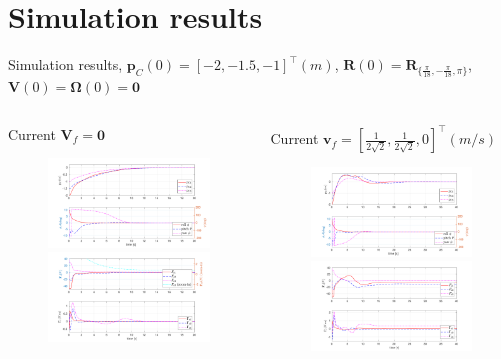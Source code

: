 \documentclass{beamer}
\begin{document}
\section{Simulation results}
\begin{frame}{Simulation results, \tiny$\mathbf{p}_C(0) = [-2, -1.5, -1 ]^{\top} (m)$, $\mathbf{R}(0) = \mathbf{R}_{\{\frac{\pi}{18},-\frac{\pi}{18},\pi\}}$, $\mathbf{V}(0) = \mathbf{\Omega}(0) = \mathbf{0}$}
	\begin{columns}
		\begin{block}{Current $\mathbf{V}_f = \mathbf{0}$}
			\begin{figure}
				\includegraphics[width = 58mm]{Images/Data_sansCurrent_pos_RollPitch_Yaw2.pdf}\\
				\includegraphics[width = 58mm]{Images/Data_sansCurrent_Fc_Gc2.pdf}
			\end{figure}
		\end{block}	
		\begin{block}{Current $\mathbf{v}_f = [\frac{1}{2\sqrt{2}}, \frac{1}{2\sqrt{2}}, 0 ]^{\top} (m/s)$}
			\begin{figure}
				\includegraphics[width = 58mm]{Images/Data_avecCurrent_pos_RollPitch_Yaw2.pdf}\\
				\includegraphics[width = 58mm]{Images/Data_avecCurrent_Fc_Gc2.pdf}
			\end{figure}
		\end{block}	
	\end{columns}
\end{frame}
\end{document}
